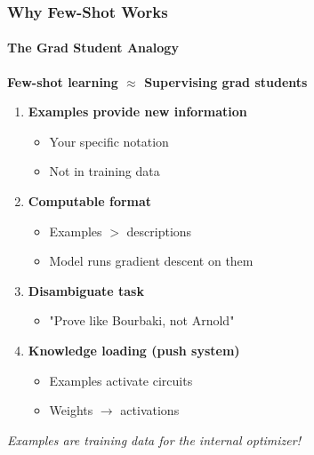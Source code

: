 \documentclass[10pt,aspectratio=169]{beamer}
\begin{document}

\begin{frame}
\frametitle{Why Few-Shot Works}
\framesubtitle{The Grad Student Analogy}

\Large
\textbf{Few-shot learning $\approx$ Supervising grad students}

\vspace{0.5cm}
\normalsize
\begin{enumerate}
    \item \textbf{Examples provide new information}
    \begin{itemize}
        \item Your specific notation
        \item Not in training data
    \end{itemize}
    
    \item \textbf{Computable format}
    \begin{itemize}
        \item Examples $>$ descriptions
        \item Model runs gradient descent on them
    \end{itemize}
    
    \item \textbf{Disambiguate task}
    \begin{itemize}
        \item "Prove like Bourbaki, not Arnold"
    \end{itemize}
    
    \item \textbf{Knowledge loading (push system)}
    \begin{itemize}
        \item Examples activate circuits
        \item Weights $\rightarrow$ activations
    \end{itemize}
\end{enumerate}

\vspace{0.5cm}
\textit{Examples are training data for the internal optimizer!}
\end{frame}

\end{document}
